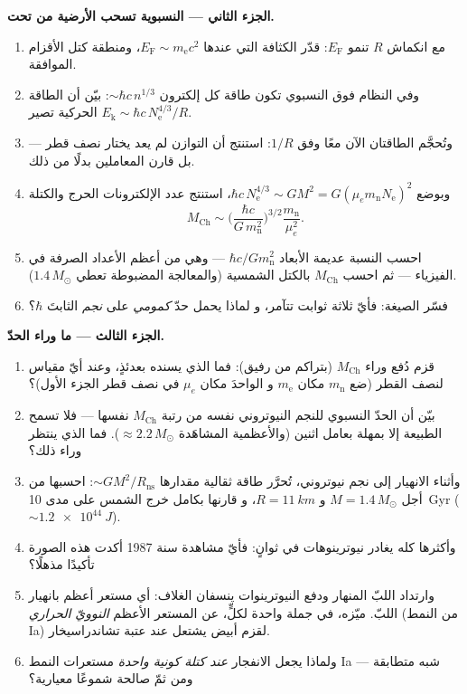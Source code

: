 \begin{problem}
\medskip\noindent\textbf{الجزء الثاني --- النسبوية تسحب الأرضية
من تحت.}
\begin{enumerate}[resume]
  \item مع انكماش $R$ تنمو $E_{\text{F}}$: قدّر الكثافة
        التي عندها $E_{\text{F}} \sim m_{\text{e}}c^2$، ومنطقة
        كتل الأقزام الموافقة.
  \item وفي النظام فوق النسبوي تكون طاقة كل إلكترون
        $\sim\hbar c\,n^{1/3}$: بيّن أن الطاقة الحركية تصير
        $E_{\text{k}} \sim \hbar c\,N_{\text{e}}^{4/3}/R$.
  \item وتُحجَّم الطاقتان الآن معًا وفق $1/R$: استنتج أن
        التوازن لم يعد يختار نصف قطر --- بل قارن
        المعاملين بدلًا من ذلك.
  \item وبوضع $\hbar c\,N_{\text{e}}^{4/3} \sim
        GM^2 = G(\mu_em_{\text{n}}N_{\text{e}})^2$، استنتج
        عدد الإلكترونات الحرج والكتلة
        \[
        M_{\text{Ch}} \sim
        \Big(\frac{\hbar c}{G\,m_{\text{n}}^2}\Big)^{3/2}
        \frac{m_{\text{n}}}{\mu_e^2} .
        \]
  \item احسب النسبة عديمة الأبعاد $\hbar c/Gm_{\text{n}}^2$
        --- وهي من أعظم الأعداد الصرفة في الفيزياء --- ثم
        احسب $M_{\text{Ch}}$ بالكتل الشمسية (والمعالجة المضبوطة تعطي
        $1.4\,M_\odot$).
  \item فسّر الصيغة: فأيّ ثلاثة ثوابت تتآمر، و
        لماذا يحمل حدّ \emph{كمومي} على \emph{نجم}
        الثابتَ $\hbar$؟
\end{enumerate}

\medskip\noindent\textbf{الجزء الثالث --- ما وراء الحدّ.}
\begin{enumerate}[resume]
  \item قزم دُفع وراء $M_{\text{Ch}}$ (بتراكم من
        رفيق): فما الذي يسنده بعدئذٍ، وعند أيّ مقياس
        لنصف القطر (ضع $m_{\text{n}}$ مكان $m_{\text{e}}$ و
        الواحدَ مكان $\mu_e$ في نصف قطر الجزء الأول)؟
  \item بيّن أن الحدّ النسبوي للنجم النيوتروني نفسه من
        رتبة $M_{\text{Ch}}$ نفسها --- فلا تسمح الطبيعة إلا
        بمهلة بعامل اثنين (والأعظمية المشاهَدة $\approx
        2.2\,M_\odot$). فما الذي ينتظر وراء ذلك؟
  \item وأثناء الانهيار إلى نجم نيوتروني، تُحرَّر طاقة ثقالية
        مقدارها $\sim GM^2/R_{
        \text{ns}}$: احسبها
        من أجل $M = 1.4\,M_\odot$ و $R = \qty{11}{km}$، و
        قارنها بكامل خرج الشمس على مدى \qty{10}{Gyr}
        ($\sim\qty{1.2e44}{J}$).
  \item وأكثرها كله يغادر نيوترينوهات في ثوانٍ: فأيّ
        مشاهدة سنة 1987 أكدت هذه الصورة تأكيدًا مذهلًا؟
  \item وارتداد اللبّ المنهار ودفع النيوترينوات ينسفان
        الغلاف: أي مستعر أعظم بانهيار اللبّ. ميّزه،
        في جملة واحدة لكلٍّ، عن المستعر الأعظم
        \emph{النوويّ الحراري} (من النمط Ia) لقزم أبيض يشتعل عند
        عتبة تشاندراسيخار.
  \item ولماذا يجعل الانفجار \emph{عند كتلة كونية واحدة}
        مستعرات النمط Ia شبه متطابقة --- ومن ثمّ صالحة
        شموعًا معيارية؟
\end{enumerate}


\end{problem}
